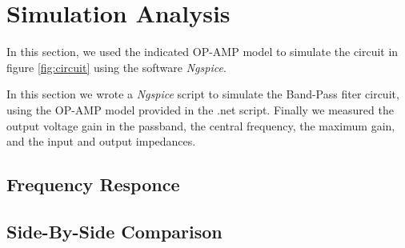 \section{Simulation Analysis}
\label{sec:simulation}

In this section, we used the indicated OP-AMP model to simulate 
the circuit in figure \ref{fig:circuit} using the software \textit{Ngspice}.


In this section we wrote a \textit{Ngspice} script to simulate the Band-Pass 
fiter circuit, using the OP-AMP model provided in the .net script.
Finally we measured the output voltage gain in the passband,
the central frequency, the maximum gain, and the input and output impedances.


\subsection{Frequency Responce}





\subsection{Side-By-Side Comparison}






